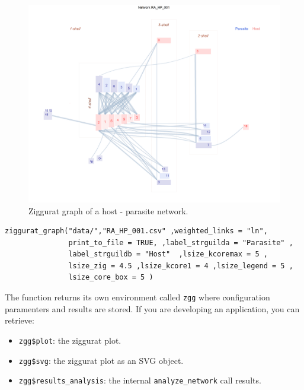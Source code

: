 \documentclass[12pt]{article}
\begin{document}
\begin{figure}[hp!]
\centering
\includegraphics[scale=0.4]{RA_HP_001_ziggurat.png}
\caption {Ziggurat graph of a host - parasite network.}
\label{fig:RA_HP_001-ziggurat}
\end{figure}

\fontsize{3.5mm}{3.5mm}\selectfont
\begin{verbatim}
ziggurat_graph("data/","RA_HP_001.csv" ,weighted_links = "ln", 
               print_to_file = TRUE, ,label_strguilda = "Parasite" ,
               label_strguildb = "Host"  ,lsize_kcoremax = 5 ,               
               lsize_zig = 4.5 ,lsize_kcore1 = 4 ,lsize_legend = 5 ,
               lsize_core_box = 5 )

\end{verbatim}
\normalsize



\clearpage

\noindent The function returns its own environment called \texttt{zgg} where configuration paramenters and results
are stored. If you are developing an application, you can retrieve:

\begin{itemize}

\item \texttt{zgg\$plot}:  the ziggurat plot.

\item \texttt{zgg\$svg}: the ziggurat plot as an SVG object.

\item \texttt{zgg\$results\_analysis}: the internal \texttt{analyze\_network} call results.

\end{itemize}
 
\end{document}
